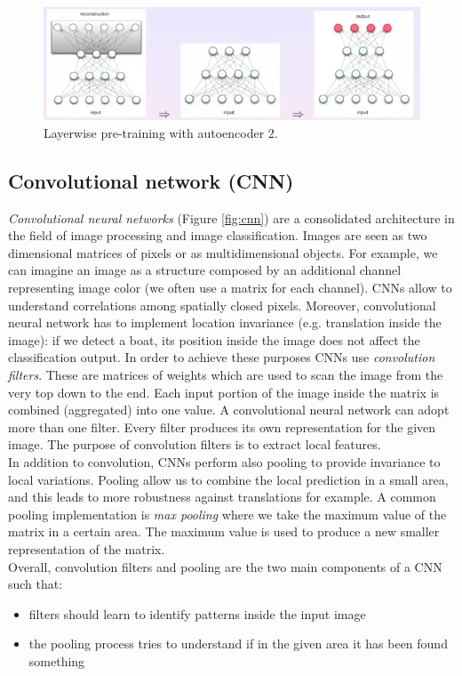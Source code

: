 \begin{figure}[H]
	\centering
	\includegraphics[width=\textwidth]{
		images/16_DeepLearning_autoencoderLayerwise2.png
	}
	\caption{Layerwise pre-training with autoencoder 2.}
	\label{fig:autoencoder_layerwise2}
\end{figure}

\subsection{Convolutional network (CNN)}
\textit{Convolutional neural networks} (Figure \ref{fig:cnn}) are a consolidated
architecture in the field of image processing and image classification. Images are
seen as two dimensional matrices of pixels or as multidimensional objects. For
example, we can imagine an image as a structure composed by an additional channel
representing image color (we often use a matrix for each channel). CNNs allow to
understand correlations among spatially closed pixels. Moreover, convolutional
neural network has to implement location invariance (e.g. translation inside the
image): if we detect a boat, its position inside the image does not affect the classification
output. In order to achieve these purposes CNNs use \textit{convolution filters}.
These are matrices of weights which are used to scan the image from the very top
down to the end. Each input portion of the image inside the matrix is combined (aggregated)
into one value. A convolutional neural network can adopt more than one filter. Every
filter produces its own representation for the given image. The purpose of
convolution filters is to extract local features. \\ In addition to convolution,
CNNs perform also pooling to provide invariance to local variations. Pooling allow
us to combine the local prediction in a small area, and this leads to more
robustness against translations for example. A common pooling implementation is \textit{max
pooling} where we take the maximum value of the matrix in a certain area. The maximum
value is used to produce a new smaller representation of the matrix. \\ Overall,
convolution filters and pooling are the two main components of a CNN such that:
\begin{itemize}
	\item filters should learn to identify patterns inside the input image

	\item the pooling process tries to understand if in the given area it has been
		found something
\end{itemize}

